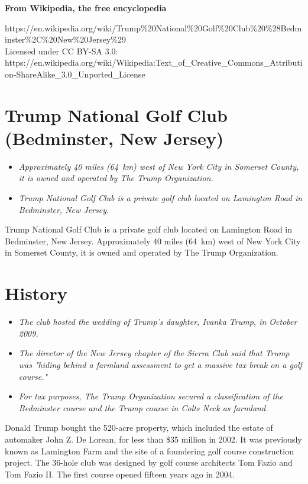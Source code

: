 \textbf{From Wikipedia, the free encyclopedia}

https://en.wikipedia.org/wiki/Trump\%20National\%20Golf\%20Club\%20\%28Bedminster\%2C\%20New\%20Jersey\%29\\
Licensed under CC BY-SA 3.0:\\
https://en.wikipedia.org/wiki/Wikipedia:Text\_of\_Creative\_Commons\_Attribution-ShareAlike\_3.0\_Unported\_License

\section{Trump National Golf Club (Bedminster, New
Jersey)}\label{trump-national-golf-club-bedminster-new-jersey}

\begin{itemize}
\item
  \emph{Approximately 40 miles (64~km) west of New York City in Somerset
  County, it is owned and operated by The Trump Organization.}
\item
  \emph{Trump National Golf Club is a private golf club located on
  Lamington Road in Bedminster, New Jersey.}
\end{itemize}

Trump National Golf Club is a private golf club located on Lamington
Road in Bedminster, New Jersey. Approximately 40 miles (64~km) west of
New York City in Somerset County, it is owned and operated by The Trump
Organization.

\section{History}\label{history}

\begin{itemize}
\item
  \emph{The club hosted the wedding of Trump's daughter, Ivanka Trump,
  in October 2009.}
\item
  \emph{The director of the New Jersey chapter of the Sierra Club said
  that Trump was "hiding behind a farmland assessment to get a massive
  tax break on a golf course."}
\item
  \emph{For tax purposes, The Trump Organization secured a
  classification of the Bedminster course and the Trump course in Colts
  Neck as farmland.}
\end{itemize}

Donald Trump bought the 520-acre property, which included the estate of
automaker John Z. De Lorean, for less than \$35 million in 2002. It was
previously known as Lamington Farm and the site of a foundering golf
course construction project. The 36-hole club was designed by golf
course architects Tom Fazio and Tom Fazio II. The first course opened
fifteen years ago in 2004.

